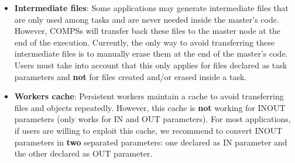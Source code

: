 \begin{itemize}
 \item \textbf{Intermediate files}: \newline Some applications may generate intermediate files that are only used among tasks
 and are never needed inside the master's code. However, COMPSs will transfer back these files to the master node at the end of the 
 execution. Currently, the only way to avoid transferring these intermediate files is to manually erase them at the end of the
 master's code. Users must take into account that this only applies for files declared as task parameters and \textbf{not} for files
 created and/or erased inside a task. 
 
 \item \textbf{Workers cache}: \newline Persistent workers maintain a cache to avoid transferring files and objects repeatedly. 
 However, this cache is \textbf{not} working for INOUT parameters (only works for IN and OUT parameters). For most applications, 
 if users are willing to exploit this cache, we recommend to convert INOUT parameters in \textbf{two} separated parameters: one 
 declared as IN parameter and the other declared as OUT parameter.
 
\end{itemize}

